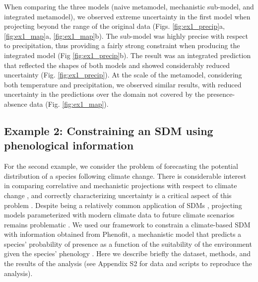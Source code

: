\documentclass[11pt]{article}
\newcommand{\rev}[1]{{\color{RoyalBlue}#1}}
\begin{document}
When comparing the three models (naive metamodel, mechanistic sub-model, and integrated metamodel), we observed extreme uncertainty in the first model when projecting beyond the range of the original data (Figs. \ref{fig:ex1_precip}a, \ref{fig:ex1_map}a, \ref{fig:ex1_map}b).
The sub-model was highly precise with respect to precipitation, thus providing a fairly strong constraint when producing the integrated model (Fig \ref{fig:ex1_precip}b).
The result was an integrated prediction that reflected the shapes of both models and showed considerably reduced uncertainty (Fig. \ref{fig:ex1_precip}).
At the scale of the metamodel, considering both temperature and precipitation, we observed similar results, with reduced uncertainty in the predictions over the domain not covered by the presence-absence data (Fig. \ref{fig:ex1_map}).


%
%


\subsection*{Example 2: Constraining an SDM using phenological information}
For the second example, we consider the problem of forecasting the potential distribution of a species following climate change.
There is considerable interest in comparing correlative and mechanistic projections with respect to climate change \citep{Morin2009}, and correctly characterizing uncertainty is a critical aspect of this problem \citep{Cheaib2012}.
Despite being a relatively common application of SDMs \citep{Guisan2005}, projecting models parameterized with modern climate data to future climate scenarios remains problematic \citep{Araujo2006}.
We used our framework to constrain a climate-based SDM with information obtained from Phenofit, a mechanistic model that predicts a species' probability of presence as a function of the suitability of the environment given the species' phenology \citep{Chuine2001, Morin2009}.
Here we describe briefly the dataset, methods, and the results of the analysis (see \rev{Appendix S2} for data and scripts to reproduce the analysis).
\end{document}
